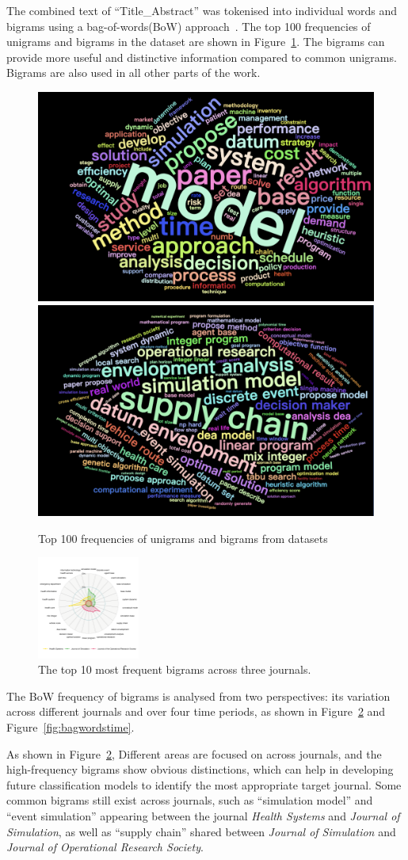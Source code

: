 \documentclass[9pt,twocolumn,twoside]{pnas-new}
\begin{document}
\noindent The combined text of ``Title\_Abstract'' was tokenised into individual words and bigrams using a bag-of-words(BoW) approach~\cite{8950616}. The top 100 frequencies of unigrams and bigrams in the dataset are shown in Figure~\ref{fig:bagwords}. The bigrams can provide more useful and distinctive information compared to common unigrams. Bigrams are also used in all other parts of the work.

\begin{figure}[!tbhp]
\centering
\includegraphics[width=0.4\linewidth]{bag_words/unigrams.png}
\includegraphics[width=0.4\linewidth]{bag_words/bigrams.png}
\caption{Top 100 frequencies of unigrams and bigrams from datasets}
\label{fig:bagwords}
\end{figure}

 \begin{figure}[!tbhp]
\centering
\includegraphics[width=0.3\textwidth]{bag_words/radar_journal.png}

\caption{The top 10 most frequent bigrams across three journals.}
\label{fig:bagwordsjournal}
\end{figure}

The BoW frequency of bigrams is analysed from two perspectives: its variation across different journals and over four time periods, as shown in Figure~\ref{fig:bagwordsjournal} and Figure~\ref{fig:bagwordstime}. 


As shown in Figure~\ref{fig:bagwordsjournal}, Different areas are focused on across journals, and the high-frequency bigrams show obvious distinctions, which can help in developing future classification models to identify the most appropriate target journal. Some common bigrams still exist across journals, such as ``simulation model'' and ``event simulation'' appearing between the journal \textit{Health Systems} and \textit{Journal of Simulation}, as well as ``supply chain'' shared between \textit{Journal of Simulation} and \textit{Journal of Operational Research Society}.
\end{document}
